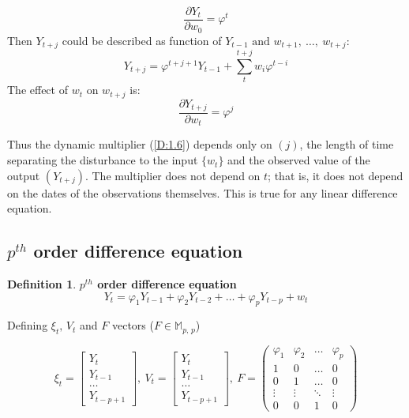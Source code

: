 \documentclass[12pt, english]{article}
\numberwithin{equation}{section} %
\theoremstyle{plain}
\theoremstyle{definition}
\newtheorem{definition}{Definition}[subsection]
\newcommand{\pardv}[2]{\dfrac{\partial #1}{\partial #2}}
\begin{document}
\begin{equation}
	\tag{D 1.4}
	\label{D:1.4}
	\pardv{Y_t}{w_0} = \varphi^t
\end{equation}
Then $Y_{t+j}$ could be described as function of $Y_{t-1} \text{ and } w_{t+1},\ \dots,\ w_{t+j}$:
\begin{equation}
	\tag{D 1.5}
	\label{D:1.5}
	Y_{t+j} = \varphi^{t+j+1} Y_{t-1} + \sum\limits_t^{t+j} w_i \varphi^{t-i}
\end{equation}
The effect of $w_t$ on $w_{t+j}$ is:
\begin{equation}
	\tag{D 1.6}
	\label{D:1.6}
	\pardv{Y_{t+j}}{w_t} = \varphi^j
\end{equation}

Thus the dynamic multiplier (\ref{D:1.6}) depends only on $(j)$, the length of time separating
the disturbance to the input $\{w_t\}$ and the observed value of the output $(Y_{t+j})$. The
multiplier does not depend on $t$; that is, it does not depend on the dates of the
observations themselves. This is true for any linear difference equation.


\subsection{$p^{th}$ order difference equation}

\begin{definition}
	\textbf{$p^{th}$ order difference equation}
	\begin{equation}
		\tag{D 2.1}
		\label{D:2.1}
		Y_t = \varphi_1 Y_{t-1} + \varphi_2 Y_{t-2} + \dots + \varphi_p Y_{t-p} + w_t
	\end{equation}
\end{definition}

Defining $\xi_t,\, V_t$ and $F$ vectors ($F \in \mathbb{M}_{p,\,p}$)

\begin{equation}
	\tag{D 2.2, 2.3}
	\label{D:2.3}
	\xi_t = \begin{bmatrix} Y_t \\ Y_{t-1} \\ \dots \\ Y_{t-p+1} \end{bmatrix},\ 
	V_t = \begin{bmatrix} Y_t \\ Y_{t-1} \\ \dots \\ Y_{t-p+1} \end{bmatrix},\ 
	F = 
	\begin{pmatrix}
		\varphi_1 & \varphi_2 & \dots & \varphi_p \\
		1 & 0 & \dots & 0 \\
		0 & 1 & \dots & 0 \\
		\vdots & \vdots & \ddots & \vdots \\
		0 & 0 & 1 & 0
	\end{pmatrix}
\end{equation}
\end{document}

